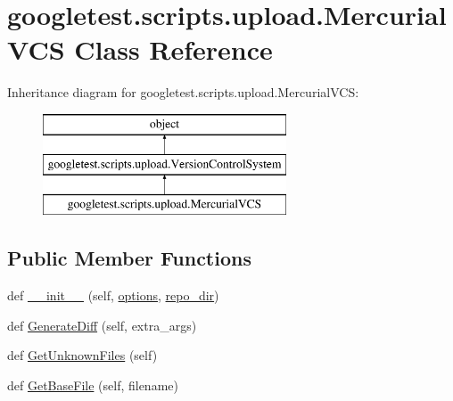 \hypertarget{classgoogletest_1_1scripts_1_1upload_1_1_mercurial_v_c_s}{}\section{googletest.\+scripts.\+upload.\+Mercurial\+V\+CS Class Reference}
\label{classgoogletest_1_1scripts_1_1upload_1_1_mercurial_v_c_s}
Inheritance diagram for googletest.\+scripts.\+upload.\+Mercurial\+V\+CS\+:\begin{figure}[H]
\begin{center}
\leavevmode
\includegraphics[height=3.000000cm]{db/d41/classgoogletest_1_1scripts_1_1upload_1_1_mercurial_v_c_s}
\end{center}
\end{figure}
\subsection*{Public Member Functions}
\begin{DoxyCompactItemize}
\item 
def \mbox{\hyperlink{classgoogletest_1_1scripts_1_1upload_1_1_mercurial_v_c_s_a5c1ce2bfd3f74ad5a0b554ed15446b35}{\+\_\+\+\_\+init\+\_\+\+\_\+}} (self, \mbox{\hyperlink{classgoogletest_1_1scripts_1_1upload_1_1_version_control_system_abd30c66b6c5c39c14df9a1fa4ffac67b}{options}}, \mbox{\hyperlink{classgoogletest_1_1scripts_1_1upload_1_1_mercurial_v_c_s_ac1412ab5eec8e991358292da2d595394}{repo\+\_\+dir}})
\item 
def \mbox{\hyperlink{classgoogletest_1_1scripts_1_1upload_1_1_mercurial_v_c_s_a14f6e335314bd90e0af5bfaf13614700}{Generate\+Diff}} (self, extra\+\_\+args)
\item 
def \mbox{\hyperlink{classgoogletest_1_1scripts_1_1upload_1_1_mercurial_v_c_s_ae616fb90f66bc9060d4e0637dc5ac9a6}{Get\+Unknown\+Files}} (self)
\item 
def \mbox{\hyperlink{classgoogletest_1_1scripts_1_1upload_1_1_mercurial_v_c_s_ab76cf6be7060406969e511b335874fb9}{Get\+Base\+File}} (self, filename)
\end{DoxyCompactItemize}
